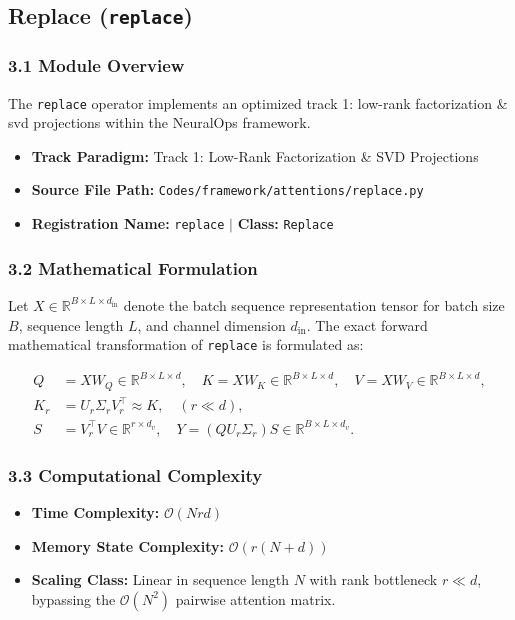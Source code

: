 \subsection{Replace (\texttt{replace})}
\label{sec:app_module_replace}

\subsubsection*{3.1 Module Overview}
The \texttt{replace} operator implements an optimized track 1: low-rank factorization \& svd projections within the NeuralOps framework.
\begin{itemize}
    \item \textbf{Track Paradigm:} Track 1: Low-Rank Factorization \& SVD Projections
    \item \textbf{Source File Path:} \texttt{Codes/framework/attentions/replace.py}
    \item \textbf{Registration Name:} \texttt{replace} $\mid$ \textbf{Class:} \texttt{Replace}
\end{itemize}

\subsubsection*{3.2 Mathematical Formulation}
Let $X \in \mathbb{R}^{B \times L \times d_{\text{in}}}$ denote the batch sequence representation tensor for batch size $B$, sequence length $L$, and channel dimension $d_{\text{in}}$. The exact forward mathematical transformation of \texttt{replace} is formulated as:

\begin{align}
Q &= X W_Q \in \mathbb{R}^{B \times L \times d}, \quad K = X W_K \in \mathbb{R}^{B \times L \times d}, \quad V = X W_V \in \mathbb{R}^{B \times L \times d}, \\
K_r &= U_r \Sigma_r V_r^\top \approx K, \quad (r \ll d), \\
S &= V_r^\top V \in \mathbb{R}^{r \times d_v}, \quad Y = (Q U_r \Sigma_r) S \in \mathbb{R}^{B \times L \times d_v}.
\end{align}


\subsubsection*{3.3 Computational Complexity}
\begin{itemize}
    \item \textbf{Time Complexity:} $\mathcal{O}(N r d)$
    \item \textbf{Memory State Complexity:} $\mathcal{O}(r(N + d))$
    \item \textbf{Scaling Class:} Linear in sequence length $N$ with rank bottleneck $r \ll d$, bypassing the $\mathcal{O}(N^2)$ pairwise attention matrix.
\end{itemize}

